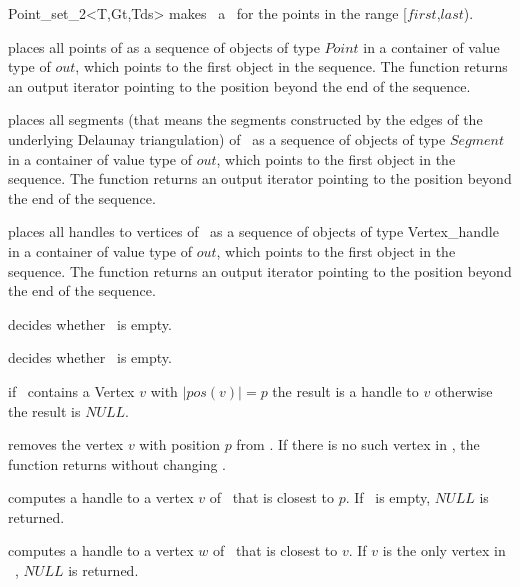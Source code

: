 \begin{ccRefClass}{Point_set_2<T,Gt,Tds>}
{ makes \ccVar\ a \ccRefName\ for the points in the range
[$first$,$last$).}

{ places all points of \ccVar as a sequence of objects of type
$Point$ in a container of value type of  $out$,
which points to the first object in the sequence. The function
returns an output iterator pointing to the position beyond the end
of the sequence.} 

{ places all segments (that means the segments constructed by the edges of the underlying
Delaunay triangulation)
of \ccVar\ as a sequence of objects of type
$Segment$ in a container of value type of $out$,
which points to the first object in the sequence. The function
returns an output iterator pointing to the position beyond the end
of the sequence.} 

\ccHtmlLinksOff

{ places all handles to vertices of \ccVar\ as a sequence of objects of type
Vertex\_handle in a container of value type of $out$,
which points to the first object in the sequence. The function
returns an output iterator pointing to the position beyond the end
of the sequence.} 

\ccHtmlLinksOn

{ decides whether \ccVar\ is empty. }

{ decides whether \ccVar\ is empty. }


\ccHtmlLinksOff

{ if \ccVar\ contains a Vertex $v$ with $|pos(v)| = p$ 
the result is a handle to $v$ otherwise the result is $NULL$. }

{ removes the vertex $v$ with position $p$ from \ccVar. If there is
no such vertex in \ccVar, the function returns without changing \ccVar. }

{ computes a handle to a vertex $v$ of \ccVar\ that is closest to $p$.
If \ccVar\ is empty, $NULL$ is returned.
}

{ computes a handle to a vertex $w$ of \ccVar\ that is closest to $v$.
If $v$ is the only vertex in \ccVar\ , $NULL$ is returned.
}


\end{ccRefClass}
